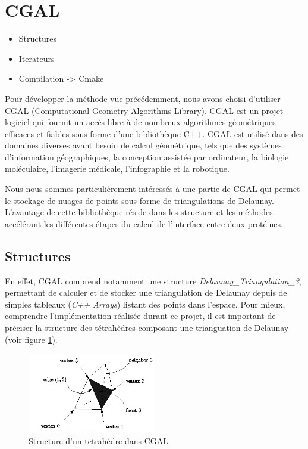 \section{CGAL}
\begin{itemize}
  \item Structures
  \item Iterateurs
  \item Compilation -> Cmake
\end{itemize}

Pour développer la méthode vue précédemment, nous avons choisi d'utiliser CGAL
(Computational Geometry Algorithms Library).
CGAL est un projet logiciel qui fournit un accès libre à de nombreux algorithmes géométriques
efficaces et fiables sous forme d'une bibliothèque C++. CGAL est utilisé dans des
domaines diverses ayant besoin de calcul géométrique, tels que des systèmes
d'information géographiques, la conception assistée par ordinateur, la biologie
moléculaire, l'imagerie médicale, l'infographie et la robotique.

Nous nous sommes particulièrement intéressés à une partie de CGAL qui permet le
stockage de nuages de points sous forme de triangulations de Delaunay. L'avantage
de cette bibliothèque réside dans les structure et les méthodes accélérant les différentes
étapes du calcul de l'interface entre deux protéines.

\subsection{Structures}


En effet, CGAL comprend notamment une structure \textit{Delaunay\_Triangulation\_3},
permettant de calculer et de stocker une triangulation de Delaunay depuis de simples
tableaux (\textit{C++ Arrays}) listant des points dans l'espace. Pour mieux, comprendre
l'implémentation réalisée durant ce projet, il est important de préciser la structure des tétrahèdres
composant une trianguation de Delaunay (voir figure \ref{fig::tetrahedron_cgal}).

\begin{figure}[ht]
\centering
  \includegraphics[width=0.5\textwidth]{figures/tetrahedron_cgal.png}
  \caption{Structure d'un tetrahèdre dans CGAL}
  \label{fig::tetrahedron_cgal}
\end{figure}

